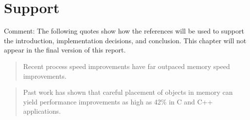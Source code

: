 \documentclass[a4paper,oneside]{memoir}
\newcommand{\makecomment}[1]{{\color{red} Comment: #1}}
\begin{document}
%
%
%
%
%
%
%
%

\chapter*{Support}

\makecomment{The following quotes show how the references will be used to support
the introduction, implementation decisions, and conclusion. This chapter will
not appear in the final version of this report.}

\blockquote{Recent process speed improvements have far outpaced memory speed
improvements.}\cite{Novark:2006}

\blockquote{Past work has shown that careful placement of objects in memory can
yield performance improvements as high as 42\% in C and C++ applications.}
\cite{Novark:2006}
\end{document}

